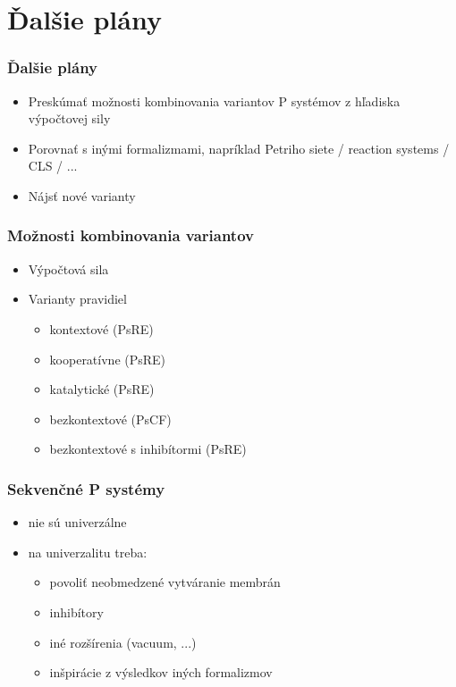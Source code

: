 \documentclass{beamer}
\begin{document}

\section{Ďalšie plány} %
\label{sec:dalsie_plany}

\begin{frame}[t]\frametitle{Ďalšie plány}
\begin{itemize}
  \item Preskúmať možnosti kombinovania variantov P systémov z hľadiska výpočtovej sily
  \item Porovnať s inými formalizmami, napríklad Petriho siete / reaction systems / CLS / ...
  \item Nájsť nové varianty
\end{itemize}
\end{frame}

\begin{frame}[t]\frametitle{Možnosti kombinovania variantov}
\begin{itemize}
  \item Výpočtová sila
  \item Varianty pravidiel
  \begin{itemize}
    \item kontextové (PsRE)
    \item kooperatívne (PsRE)
    \item katalytické (PsRE)
    \item bezkontextové (PsCF)

    \item bezkontextové s inhibítormi (PsRE)
  \end{itemize}
\end{itemize}
\end{frame}

\begin{frame}[t]\frametitle{Sekvenčné P systémy}
\begin{itemize}
  \item nie sú univerzálne
  \item na univerzalitu treba:
  \begin{itemize}
    \item povoliť neobmedzené vytváranie membrán
    \item inhibítory
    \item iné rozšírenia (vacuum, ...)
    \item inšpirácie z výsledkov iných formalizmov
  \end{itemize}
\end{itemize}
\end{frame}
\end{document}

